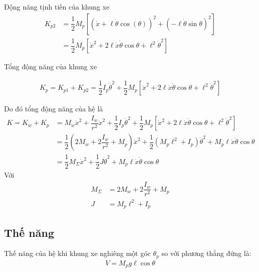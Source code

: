             Động năng tịnh tiến của khung xe
            \begin{align}
                K_{p2} &= \dfrac{1}{2} M_p \left[(\dot{x}+\ell \dot{\theta} \cos(\theta))^2 + (-\ell \dot{\theta}\sin \theta)^2\right] \nonumber\\
                       &=\dfrac{1}{2} M_p \left[\dot{x}^2 + 2 \ell \dot{x} \dot{\theta} \cos \theta + \ell^2 \dot{\theta}^2\right] 
            \end{align}
            
            Tổng động năng của khung xe
            
            \begin{align}
                K_{p} = K_{p1} + K_{p2} = \dfrac{1}{2} I_p \dot{\theta}^2 + \dfrac{1}{2} M_p \left[\dot{x}^2 + 2 \ell \dot{x} \dot{\theta} \cos \theta + \ell^2 \dot{\theta}^2\right]
            \end{align}

            Do đó tổng động năng của hệ là
            \begin{align}
                K = K_w + K_p &= M_w \dot{x}^2 + \dfrac{I_w}{r^2} \dot{x}^2 + \dfrac{1}{2} I_p \dot{\theta}^2 + \dfrac{1}{2} M_p \left[\dot{x}^2 + 2 \ell \dot{x} \dot{\theta} \cos \theta + \ell^2 \dot{\theta}^2\right] \nonumber\\
                    &= \dfrac{1}{2} \left(2M_w + 2 \dfrac{I_w}{r^2} + M_p\right) \dot{x}^2 + \dfrac{1}{2} \left(M_p \ell^2 + I_p\right)\dot{\theta}^2 + M_p \ell \dot{x} \dot{\theta} \cos \theta \nonumber\\
                    &= \dfrac{1}{2} M_{\Sigma} \dot{x}^2 + \dfrac{1}{2} J \dot{\theta}^2 + M_p \ell \dot{x} \dot{\theta} \cos \theta
             \end{align}
             Với
             \begin{align}
                M_{\Sigma} &= 2M_w + 2 \dfrac{I_w}{r^2} + M_p \nonumber\\
                J &= M_p \ell^2 + I_p \nonumber
             \end{align}
    \subsection*{Thế năng}
            Thế năng của hệ khi khung xe nghiêng một góc $\theta_p$ so với phương thẳng đứng là:
            \begin{align}
                V = M_p g \ell \cos \theta
            \end{align}         


